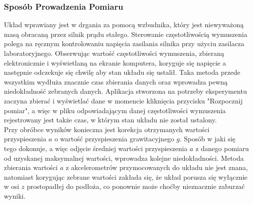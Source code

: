 \documentclass[12pt]{article}
\begin{document}
\subsubsection*{Sposób Prowadzenia Pomiaru}
Układ wprawiany jest w drgania za pomocą wzbudnika, który jest niewyważoną masą obracaną przez silnik prądu stałego. Sterowanie częstotliwością wymuszenia polega na ręcznym kontrolowaniu napięcia zasilania silnika przy użyciu zasilacza laboratoryjnego. Obserwując wartość częstotliwości wymuszenia, zbieraną elektronicznie i wyświetlaną na ekranie komputera, koryguje się napięcie a następnie odczekuje się chwilę aby stan układu się ustalił. Taka metoda przede wszystkim wydłuża znacznie czas zbierania danych oraz wprowadza pewną niedokładność zebranych danych. Aplikacja stworzona na potrzeby eksperymentu zaczyna zbierać i wyświetlać dane w momencie kliknięcia przycisku "Rozpocznij pomiar", a więc w pliku odpowiadającym danej częstotliwości wymuszenia rejestrowany jest także czas, w którym stan układu nie został ustalony. \\Przy obróbce wyników konieczna jest korekcja otrzymanych wartości przyspieszenia $a$ o wartość przyspieszenia grawitacyjnego $g$. Sposób w jaki się tego dokonuje, a więc odjęcie średniej wartości przyspieszenia $a$ z danego pomiaru od uzyskanej maksymalnej wartości, wprowadza kolejne niedokładności. Metoda zbierania wartości $a$ z akcelerometrów przymocowanych do układu nie jest znana, natomiast korygując zebrane wartości zakłada się, że układ porusza się wyłącznie w osi $z$ prostopadłej do podłoża, co ponownie może choćby nieznacznie zaburzać wyniki.
\newpage
\end{document}
